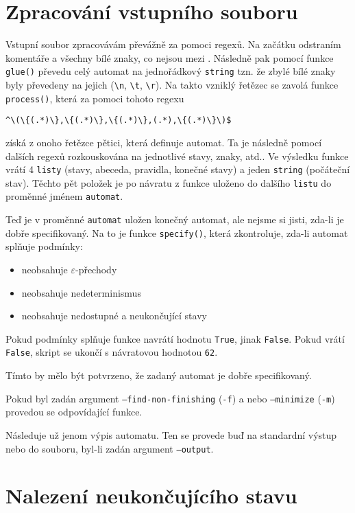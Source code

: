 \documentclass[a4paper, 11pt]{article}
\begin{document}
\section{Zpracování vstupního souboru}

Vstupní soubor zpracovávám převážně za pomoci regexů. Na začátku odstraním komentáře a všechny bílé znaky, co nejsou mezi \textquotesingle\textquotesingle. Následně pak pomocí funkce \texttt{glue()} převedu celý automat na jednořádkový \texttt{string} tzn. že zbylé bílé znaky byly převedeny na jejich  (\verb|\n|, \verb|\t|, \verb|\r|). Na takto vzniklý řetězec se zavolá funkce \texttt{process()}, která za pomoci tohoto regexu
\begin{center}
	\verb|^\(\{(.*)\},\{(.*)\},\{(.*)\},(.*),\{(.*)\}\)$|
\end{center}
získá z onoho řetězce pětici, která definuje automat. Ta je následně pomocí dalších regexů rozkouskována na jednotlivé stavy, znaky, atd.. Ve výsledku funkce vrátí 4 \texttt{listy} (stavy, abeceda, pravidla, konečné stavy) a jeden \texttt{string} (počáteční stav). Těchto pět položek je po návratu z funkce uloženo do dalšího \texttt{listu} do proměnné jménem \texttt{automat}.

\pagebreak

Teď je v proměnné \texttt{automat} uložen konečný automat, ale nejsme si jisti, zda-li je dobře specifikovaný. Na to je funkce \texttt{specify()}, která zkontroluje, zda-li automat splňuje podmínky:
\begin{itemize}
	\item neobsahuje $\varepsilon$-přechody
	\item neobsahuje nedeterminismus
	\item neobsahuje nedostupné a neukončující stavy
\end{itemize}
Pokud podmínky splňuje funkce navrátí hodnotu \texttt{True}, jinak \texttt{False}. Pokud vrátí \texttt{False}, skript se ukončí s návratovou hodnotou \texttt{62}.

Tímto by mělo být potvrzeno, že zadaný automat je dobře specifikovaný.

Pokud byl zadán argument \texttt{--find-non-finishing} (\texttt{-f}) a nebo \texttt{--minimize} (\texttt{-m}) provedou se odpovídající funkce.

Následuje už jenom výpis automatu. Ten se provede buď na standardní výstup nebo do souboru, byl-li zadán argument \texttt{--output}.

\section{Nalezení neukončujícího stavu}
\end{document}
